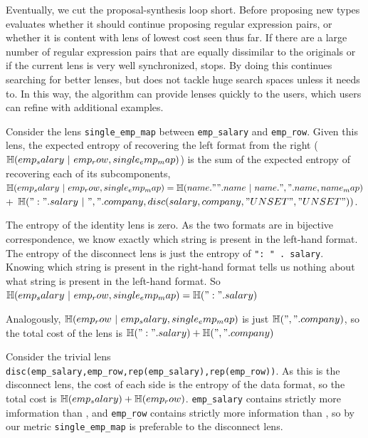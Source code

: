 \documentclass[acmsmall,screen,anonymous]{acmart}
\begin{document}
 Eventually, we cut the proposal-synthesis
loop short. Before proposing new types \RXSearch evaluates whether it should
continue proposing regular expression pairs, or whether it is content with lens
of lowest cost seen thus far. If there are a large number of regular expression
pairs that are equally dissimilar to the originals or if the current lens is
very well synchronized, \RXSearch stops. By doing this \RXSearch continues
searching for better lenses, but does not tackle huge search spaces unless it
needs to. In this way, the algorithm can provide lenses quickly to the users,
which users can refine with additional examples.


 Consider the lens \lstinline{single_emp_map} between
\lstinline{emp_salary} and \lstinline{emp_row}. Given this lens, the expected
entropy of recovering the left format from the right
($\EntropyOf{\lstinline{emp_salary} \Given \lstinline{emp_row},
  \lstinline{single_emp_map} }$) is the sum of the expected entropy of
recovering each of its subcomponents, $\EntropyOf{\lstinline{emp_salary} \Given
  \lstinline{emp_row}, \lstinline{single_emp_map} } = \EntropyOf{\lstinline{name
    . " " . name} \Given \lstinline{name . "," . name}, \lstinline{name_map}
}$\\ + $\EntropyOf{\lstinline{": " . salary} \Given
  \lstinline{"," . company}, \lstinline{disc(salary,company,"UNSET","UNSET")}
}$.

The entropy of the identity lens is zero. As the two formats are in bijective
correspondence, we know exactly which string is present in the left-hand format.
The entropy of the disconnect lens is just the entropy of
\lstinline{": " . salary}.  Knowing which string is present in the right-hand
format tells us nothing about what string is present in the left-hand format. So
$\EntropyOf{\lstinline{emp_salary} \Given \lstinline{emp_row},
  \lstinline{single_emp_map} } = \EntropyOf{\lstinline{": " . salary} }$

Analogously, $\EntropyOf{\lstinline{emp_row} \Given \lstinline{emp_salary},
  \lstinline{single_emp_map} }$ is just $\EntropyOf{\lstinline{"," . company}
}$, so the total cost of the lens is $\EntropyOf{\lstinline{": " . salary}} +
\EntropyOf{\lstinline{"," . company}}$

Consider the trivial lens
\lstinline{disc(emp_salary,emp_row,rep(emp_salary),rep(emp_row))}. As this is
the disconnect lens, the cost of each side is the entropy of the data format, so
the total cost is $\EntropyOf{\lstinline{emp_salary}} +
\EntropyOf{\lstinline{emp_row}}$. \lstinline{emp_salary} contains strictly more
imformation than , and \lstinline{emp_row}
contains strictly more information than ,
so by our metric \lstinline{single_emp_map} is preferable to the disconnect
lens.
\end{document}
